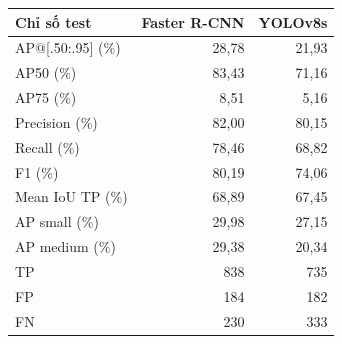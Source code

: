 \begin{tabular}{lrr}
\toprule
Chỉ số test & Faster R-CNN & YOLOv8s \\
\midrule
AP@[.50:.95] (\%) & 28,78 & 21,93 \\
AP50 (\%) & 83,43 & 71,16 \\
AP75 (\%) & 8,51 & 5,16 \\
Precision (\%) & 82,00 & 80,15 \\
Recall (\%) & 78,46 & 68,82 \\
F1 (\%) & 80,19 & 74,06 \\
Mean IoU TP (\%) & 68,89 & 67,45 \\
AP small (\%) & 29,98 & 27,15 \\
AP medium (\%) & 29,38 & 20,34 \\
TP & 838 & 735 \\
FP & 184 & 182 \\
FN & 230 & 333 \\
\bottomrule
\end{tabular}
